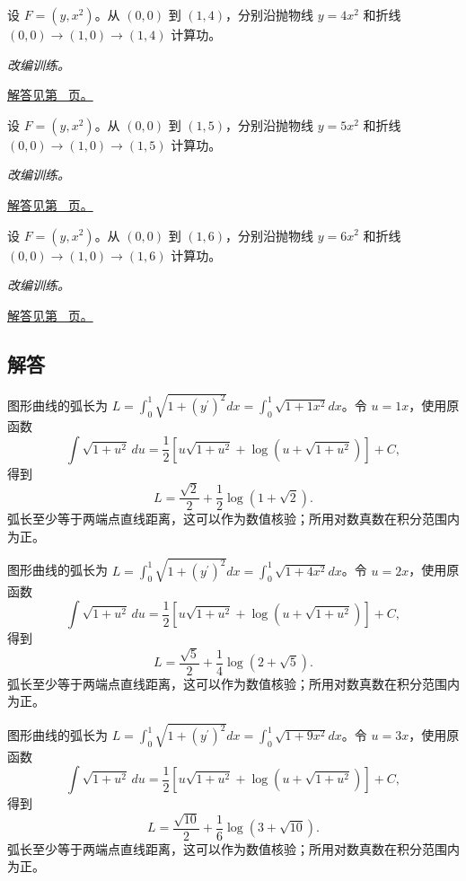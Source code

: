 \documentclass[12pt,fontset=fandol]{ctexart}
\begin{document}
\begin{example}[两条路径给出不同功]\label{ex:c42q22}
设 $F=(y,x^2)$。从 $(0,0)$ 到 $(1,4)$，分别沿抛物线 $y=4x^2$ 和折线 $(0,0)\to(1,0)\to(1,4)$ 计算功。
\par\textit{改编训练。}\par\hyperref[ans:c42q22]{解答见第~\pageref{ans:c42q22} 页。}
\end{example}
\begin{example}[两条路径给出不同功]\label{ex:c42q23}
设 $F=(y,x^2)$。从 $(0,0)$ 到 $(1,5)$，分别沿抛物线 $y=5x^2$ 和折线 $(0,0)\to(1,0)\to(1,5)$ 计算功。
\par\textit{改编训练。}\par\hyperref[ans:c42q23]{解答见第~\pageref{ans:c42q23} 页。}
\end{example}
\begin{example}[两条路径给出不同功]\label{ex:c42q24}
设 $F=(y,x^2)$。从 $(0,0)$ 到 $(1,6)$，分别沿抛物线 $y=6x^2$ 和折线 $(0,0)\to(1,0)\to(1,6)$ 计算功。
\par\textit{改编训练。}\par\hyperref[ans:c42q24]{解答见第~\pageref{ans:c42q24} 页。}
\end{example}
\subsection{解答}
\begin{solve}\label{ans:c42q1}
图形曲线的弧长为 $L=\int_0^1\sqrt{1+(y^{\prime})^2}dx=\int_0^1\sqrt{1+1x^2}dx$。令 $u=1x$，使用原函数
\[
\int\sqrt{1+u^2}\,du=\frac12\left[u\sqrt{1+u^2}+\log(u+\sqrt{1+u^2})\right]+C,
\]
得到
\[
L=\frac{\sqrt{2}}2+\frac{1}{2}\log(1+\sqrt{2}).
\]
弧长至少等于两端点直线距离，这可以作为数值核验；所用对数真数在积分范围内为正。
\end{solve}

\begin{solve}\label{ans:c42q2}
图形曲线的弧长为 $L=\int_0^1\sqrt{1+(y^{\prime})^2}dx=\int_0^1\sqrt{1+4x^2}dx$。令 $u=2x$，使用原函数
\[
\int\sqrt{1+u^2}\,du=\frac12\left[u\sqrt{1+u^2}+\log(u+\sqrt{1+u^2})\right]+C,
\]
得到
\[
L=\frac{\sqrt{5}}2+\frac{1}{4}\log(2+\sqrt{5}).
\]
弧长至少等于两端点直线距离，这可以作为数值核验；所用对数真数在积分范围内为正。
\end{solve}

\begin{solve}\label{ans:c42q3}
图形曲线的弧长为 $L=\int_0^1\sqrt{1+(y^{\prime})^2}dx=\int_0^1\sqrt{1+9x^2}dx$。令 $u=3x$，使用原函数
\[
\int\sqrt{1+u^2}\,du=\frac12\left[u\sqrt{1+u^2}+\log(u+\sqrt{1+u^2})\right]+C,
\]
得到
\[
L=\frac{\sqrt{10}}2+\frac{1}{6}\log(3+\sqrt{10}).
\]
弧长至少等于两端点直线距离，这可以作为数值核验；所用对数真数在积分范围内为正。
\end{solve}
\end{document}
